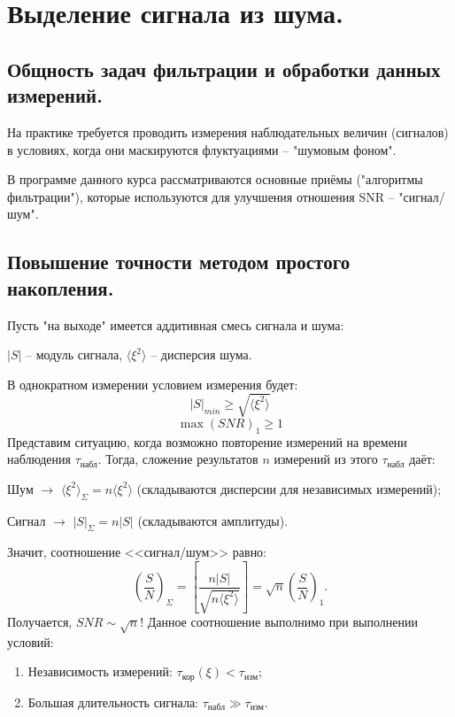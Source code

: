 \documentclass[../main/main.tex]{subfiles}
\begin{document}
\section{Выделение сигнала из шума.}

\subsection{Общность задач фильтрации и обработки данных измерений.}

На практике требуется проводить измерения наблюдательных величин (сигналов) в условиях, когда они маскируются флуктуациями -- "шумовым фоном". 

В программе данного курса рассматриваются основные приёмы ("алгоритмы фильтрации"), которые используются для улучшения отношения SNR -- "сигнал/шум".

\subsection{Повышение точности методом простого накопления.}

Пусть "на выходе"{} имеется аддитивная смесь сигнала и шума: 

$|S|$ -- модуль сигнала, $\langle \xi^2 \rangle$ -- дисперсия шума.

В однократном измерении условием измерения будет: $$|S|_{min} \geqslant \sqrt{\langle \xi^2 \rangle}$$
\begin{equation}
    \max(SNR)_1 \geqslant 1
\end{equation}
Представим ситуацию, когда возможно повторение измерений на времени наблюдения $\tau_{\text{набл}}$. Тогда, сложение результатов $n$ измерений из этого $\tau_{\text{набл}}$ даёт: 

Шум $\rightarrow$ $\langle \xi^2 \rangle_\Sigma = n \langle \xi^2 \rangle$ (складываются дисперсии для независимых измерений);

Сигнал $\rightarrow$ $|S|_\Sigma = n |S|$ (складываются амплитуды).

Значит, соотношение <<сигнал/шум>> равно: 
\begin{equation}
    \left( \frac{S}{N} \right)_\Sigma = \left[ \frac{n |S|}{\sqrt{n \langle \xi^2 \rangle}} \right] = \sqrt{n} \left( \frac{S}{N}\right)_1 .
\end{equation}
Получается, $SNR \sim \sqrt{n}$! Данное соотношение выполнимо при выполнении условий: 
\begin{enumerate}
    \item Независимость измерений: $\tau_{\text{кор}} (\xi) < \tau_{\text{изм}}$;
    \item Большая длительность сигнала: $\tau_{\text{набл}} \gg \tau_{\text{изм}}$.
\end{enumerate}
\end{document}
